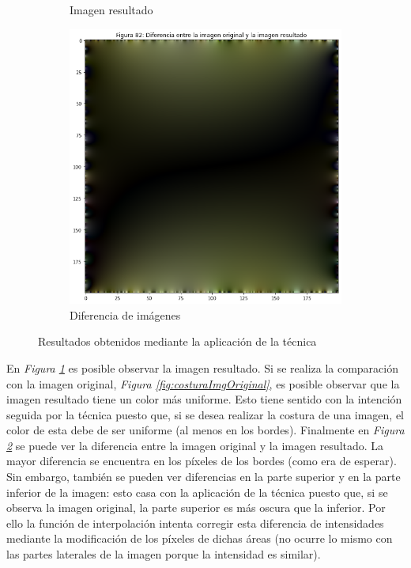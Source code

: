 \documentclass[11pt,twoside,titlepage,a4paper]{article}
\numberwithin{equation}{section} %
\theoremstyle{usual}
\begin{document}
\begin{figure}[h]
\begin{subfigure}[t]{.3\textwidth}
        \caption{Imagen resultado}
        \label{fig:costuraResultado}
    \end{subfigure}
    \centering
    \begin{subfigure}[t]{.3\textwidth}
        \centering
        \includegraphics[width=\textwidth]{imagenes/PoissonImageEditing_cell_89_output_3.png}
        \caption{Diferencia de imágenes}
        \label{fig:costuraDiferencia}
    \end{subfigure}
    \caption{Resultados obtenidos mediante la aplicación de la técnica}
    \label{fig:resultadosCosturaImagenes}
\end{figure}

En \textit{Figura \ref{fig:costuraResultado}} es posible observar la imagen resultado. Si se realiza la comparación con la imagen original, \textit{Figura \ref{fig:costuraImgOriginal}}, es posible observar que la imagen resultado tiene un color más uniforme. Esto tiene sentido con la intención seguida por la técnica puesto que, si se desea realizar la costura de una imagen, el color de esta debe de ser uniforme (al menos en los bordes). Finalmente en \textit{Figura \ref{fig:costuraDiferencia}} se puede ver la diferencia entre la imagen original y la imagen resultado. La mayor diferencia se encuentra en los píxeles de los bordes (como era de esperar). Sin embargo, también se pueden ver diferencias en la parte superior y en la parte inferior de la imagen: esto casa con la aplicación de la técnica puesto que, si se observa la imagen original, la parte superior es más oscura que la inferior. Por ello la función de interpolación intenta corregir esta diferencia de intensidades mediante la modificación de los píxeles de dichas áreas (no ocurre lo mismo con las partes laterales de la imagen porque la intensidad es similar).
\end{document}
